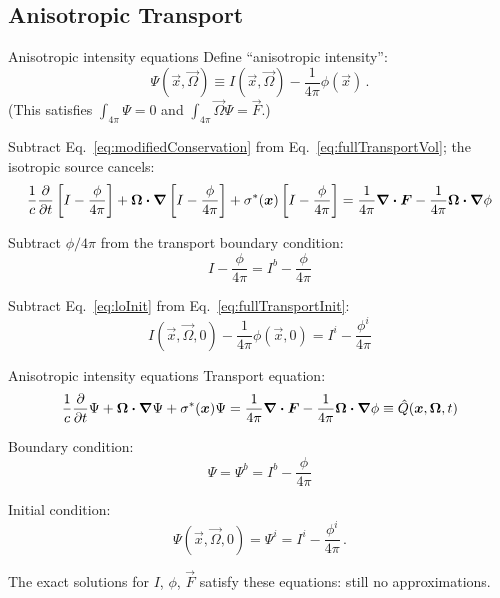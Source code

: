 \documentclass{beamer}
\begin{document}
\subsection{Anisotropic Transport}
\begin{frame}{Anisotropic intensity equations}
  Define ``anisotropic intensity'':
  \begin{equation} \label{eq:capPsi}
    \Psi(\vec{x}, \vec{\Omega}) \equiv I(\vec{x}, \vec{\Omega})
    - \frac{1}{4\pi} \phi(\vec{x})\,.
  \end{equation}
  (This satisfies $\int_{4\pi} \Psi=0$ and $\int_{4\pi} \vec{\Omega} \Psi =
  \vec{F}$.)

  Subtract Eq.~\eqref{eq:modifiedConservation} from
  Eq.~\eqref{eq:fullTransportVol}; the isotropic source cancels:
\begin{multline*}
  \frac{1}{c} \frac{\partial }{\partial t} \left[ I - \frac{\phi}{4\pi} \right]
    + \bm{\Omega}\bm{\cdot} \bm{\nabla} \left[ I - \frac{\phi}{4\pi} \right]
    + \sigma^\ast(\bm{x})\left[ I - \frac{\phi}{4\pi} \right]
  = \frac{1}{4\pi} \bm{\nabla} \bm{\cdot}\bm{F} -
  \frac{1}{4\pi} \bm{\Omega}\bm{\cdot} \bm{\nabla} \phi
\end{multline*}

  Subtract $\phi/4\pi$ from the transport boundary condition:
  \begin{equation*}
    I - \frac{\phi}{4\pi} = I^b - \frac{\phi}{4\pi}
  \end{equation*}

  Subtract Eq.~\eqref{eq:loInit} from Eq.~\eqref{eq:fullTransportInit}:
  \begin{equation*}
    I(\vec{x}, \vec{\Omega}, 0) - \frac{1}{4\pi}\phi(\vec{x}, 0)
    = I^i - \frac{\phi^i}{4\pi}
  \end{equation*}
\end{frame}

\begin{frame}{Anisotropic intensity equations}
  Transport equation:
\begin{equation*}
  \frac{1}{c} \frac{\partial }{\partial t} \Psi
   + \bm{\Omega}\bm{\cdot} \bm{\nabla} \Psi
   + \sigma^\ast(\bm{x}) \Psi
  = \frac{1}{4\pi} \bm{\nabla} \bm{\cdot}\bm{F} -
  \frac{1}{4\pi} \bm{\Omega}\bm{\cdot} \bm{\nabla} \phi
  \equiv \hat Q(\bm{x}, \bm{\Omega}, t)
\end{equation*}

  Boundary condition:
  \begin{equation*}
    \Psi = \Psi^b = I^b - \frac{\phi}{4\pi}
  \end{equation*}

  Initial condition:
  \begin{equation*}
    \Psi(\vec{x}, \vec{\Omega}, 0) = \Psi^i = I^i - \frac{\phi^i}{4\pi} \,.
  \end{equation*}

  The exact solutions for $I$, $\phi$, $\vec{F}$ satisfy these equations: still
  no approximations.
\end{frame}
\end{document}
